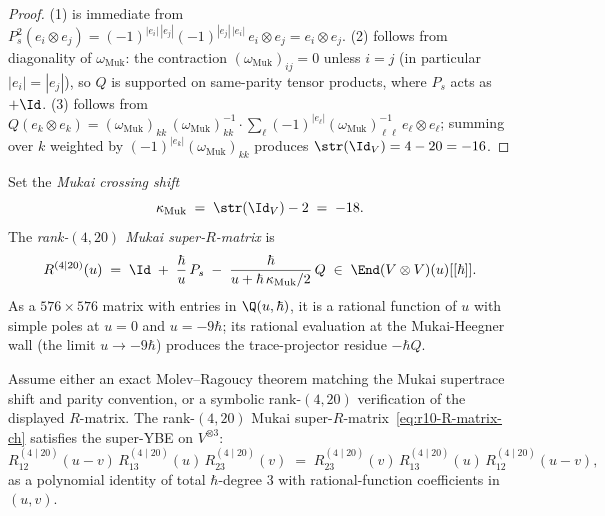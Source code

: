 \begin{proof}
(1) is immediate from
$P_s^2(e_i \otimes e_j) = (-1)^{|e_i|\,|e_j|} (-1)^{|e_j|\,|e_i|}\,
e_i \otimes e_j = e_i \otimes e_j$.
(2) follows from diagonality of $\omega_{\mathrm{Muk}}$: the
contraction $(\omega_{\mathrm{Muk}})_{ij} = 0$ unless $i = j$ (in
particular $|e_i| = |e_j|$), so $Q$ is supported on same-parity
tensor products, where $P_s$ acts as $+\Id$.
(3) follows from
$Q(e_k \otimes e_k) = (\omega_{\mathrm{Muk}})_{kk}\,
(\omega_{\mathrm{Muk}})^{-1}_{kk} \cdot \sum_\ell (-1)^{|e_\ell|}
(\omega_{\mathrm{Muk}})^{-1}_{\ell\ell}\, e_\ell \otimes e_\ell$;
summing over $k$ weighted by $(-1)^{|e_k|} (\omega_{\mathrm{Muk}})_{kk}$
produces $\str(\Id_V) = 4 - 20 = -16$.
\end{proof}

\begin{definition}
\label{def:r10-R-matrix-ch}
Set the \emph{Mukai crossing shift}
\begin{equation}
 \label{eq:r10-kappa-Muk-ch}
 \kappa_{\mathrm{Muk}}
 \;=\;
 \str(\Id_V) - 2
 \;=\;
 -18.
\end{equation}
The \emph{rank-$(4, 20)$ Mukai super-$R$-matrix} is
\begin{equation}
 \label{eq:r10-R-matrix-ch}
 R^{(4 \mid 20)}(u)
 \;=\;
 \Id
 \;+\; \frac{\hbar}{u}\, P_s
 \;-\; \frac{\hbar}{u + \hbar\, \kappa_{\mathrm{Muk}}/2}\, Q
 \;\in\; \End(V \otimes V)(u)[[\hbar]].
\end{equation}
As a $576 \times 576$ matrix with entries in $\Q(u, \hbar)$, it is a
rational function of $u$ with simple poles at $u = 0$ and $u = -9\hbar$;
its rational evaluation at the Mukai-Heegner wall (the limit
$u \to -9\hbar$) produces the trace-projector residue $-\hbar Q$.
\end{definition}

\begin{theorem}
\label{thm:r10-super-YBE-ch}
Assume either an exact Molev--Ragoucy theorem matching the Mukai
supertrace shift and parity convention, or a symbolic rank-$(4,20)$
verification of the displayed $R$-matrix.
The rank-$(4, 20)$ Mukai super-$R$-matrix~\eqref{eq:r10-R-matrix-ch}
satisfies the super-YBE on $V^{\otimes 3}$:
\begin{equation}
 \label{eq:r10-super-YBE-ch}
 R^{(4 \mid 20)}_{12}(u - v)\,
 R^{(4 \mid 20)}_{13}(u)\,
 R^{(4 \mid 20)}_{23}(v)
 \;=\;
 R^{(4 \mid 20)}_{23}(v)\,
 R^{(4 \mid 20)}_{13}(u)\,
 R^{(4 \mid 20)}_{12}(u - v),
\end{equation}
as a polynomial identity of total $\hbar$-degree $3$ with
rational-function coefficients in $(u, v)$.
\end{theorem}

